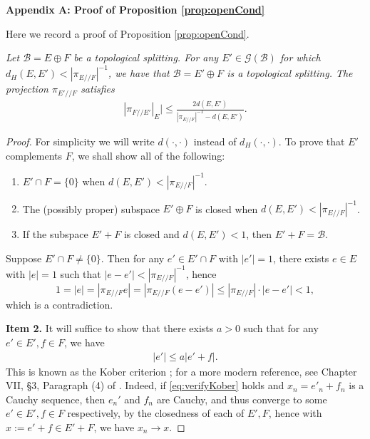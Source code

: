 \documentclass[11pt]{amsart}
\theoremstyle{theorem}
\theoremstyle{definition}
\numberwithin{equation}{section}
\newcommand{\Gc}{\mathcal{G}}
\newcommand{\Bc}{\mathcal{B}}
\newcommand{\ds}{/ \! /}
\begin{document}
\begin{center}{\bf  Appendix A: Proof of Proposition \ref{prop:openCond}}\end{center}

\smallskip
Here we record a proof of Proposition \ref{prop:openCond}.
\smallskip

 \textit{Let $\Bc = E \oplus F$ be a topological splitting. For any $E' \in \Gc(\Bc)$ for which $d_H(E, E') < |\pi_{E \ds F}|^{-1}$, we have that $\Bc = E' \oplus F$ is a topological splitting.
The projection $\pi_{E' \ds F}$ satisfies}
\begin{align}\label{eq:graphNorm2}
|\pi_{F \ds E'}|_E| \leq \frac{2 d(E, E')}{|\pi_{E \ds F}|^{-1} - d(E, E')}.
\end{align}

\begin{proof}
For simplicity we will write $d(\cdot, \cdot)$ instead of $d_H(\cdot, \cdot)$. To prove that $E'$ complements $F$, we shall show all of the following:
\begin{enumerate}
\item $E' \cap F = \{0\}$ when $d(E, E') < |\pi_{E \ds F}|^{-1}$.
\item The (possibly proper) subspace $E' \oplus F$ is closed when $d(E, E') < |\pi_{E \ds F}|^{-1}$.
\item If the subspace $E' + F$ is closed and $d(E, E') < 1$, then $E' + F = \Bc$.
\end{enumerate}

 Suppose $E' \cap F \ne \{0\}$. Then for any $e' \in E' \cap F$ with $|e'|=1$,
there exists $e \in E$ with $|e|=1$ such that $|e-e'| < |\pi_{E \ds F}|^{-1}$, hence
\[
1 = |e| = |\pi_{E \ds F} e|  = |\pi_{E \ds F} (e - e')| \leq |\pi_{E \ds F}| \cdot |e - e'| < 1,
\]
which is a contradiction.

\smallskip \noindent
{\bf Item 2.} It will suffice to show that there exists $a > 0$ such that for any $e' \in E', f \in F$, we have
\begin{align} \label{eq:verifyKober}
|e'| \leq a |e' + f|.
\end{align}
This is known as the Kober criterion \cite{Ko}; for a more modern reference, see Chapter VII, \S3, Paragraph (4) of \cite{Day}. Indeed, if \eqref{eq:verifyKober} holds and $x_n = e'_n + f_n$ is a Cauchy sequence, then $e_n'$ and $f_n$ are Cauchy, and thus converge to some $e' \in E', f \in F$ respectively, by the closedness of each of $E', F$, hence with $x := e' + f \in E' + F$, we have $x_n \to x $.


\end{proof}
\end{document}
